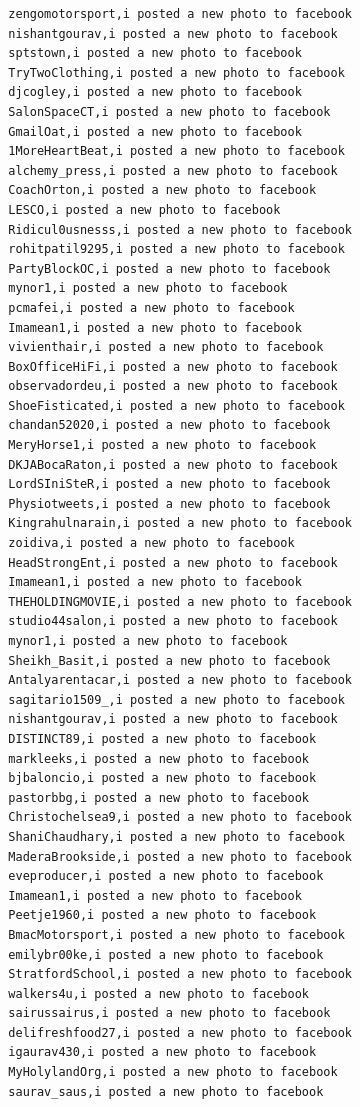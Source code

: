 \begin{figure}[htpb]
\begin{verbatim}
  zengomotorsport,i posted a new photo to facebook
  nishantgourav,i posted a new photo to facebook
  sptstown,i posted a new photo to facebook
  TryTwoClothing,i posted a new photo to facebook
  djcogley,i posted a new photo to facebook
  SalonSpaceCT,i posted a new photo to facebook
  GmailOat,i posted a new photo to facebook
  1MoreHeartBeat,i posted a new photo to facebook
  alchemy_press,i posted a new photo to facebook
  CoachOrton,i posted a new photo to facebook
  LESCO,i posted a new photo to facebook
  Ridicul0usnesss,i posted a new photo to facebook
  rohitpatil9295,i posted a new photo to facebook
  PartyBlockOC,i posted a new photo to facebook
  mynor1,i posted a new photo to facebook
  pcmafei,i posted a new photo to facebook
  Imamean1,i posted a new photo to facebook
  vivienthair,i posted a new photo to facebook
  BoxOfficeHiFi,i posted a new photo to facebook
  observadordeu,i posted a new photo to facebook
  ShoeFisticated,i posted a new photo to facebook
  chandan52020,i posted a new photo to facebook
  MeryHorse1,i posted a new photo to facebook
  DKJABocaRaton,i posted a new photo to facebook
  LordSIniSteR,i posted a new photo to facebook
  Physiotweets,i posted a new photo to facebook
  Kingrahulnarain,i posted a new photo to facebook
  zoidiva,i posted a new photo to facebook
  HeadStrongEnt,i posted a new photo to facebook
  Imamean1,i posted a new photo to facebook
  THEHOLDINGMOVIE,i posted a new photo to facebook
  studio44salon,i posted a new photo to facebook
  mynor1,i posted a new photo to facebook
  Sheikh_Basit,i posted a new photo to facebook
  Antalyarentacar,i posted a new photo to facebook
  sagitario1509_,i posted a new photo to facebook
  nishantgourav,i posted a new photo to facebook
  DISTINCT89,i posted a new photo to facebook
  markleeks,i posted a new photo to facebook
  bjbaloncio,i posted a new photo to facebook
  pastorbbg,i posted a new photo to facebook
  Christochelsea9,i posted a new photo to facebook
  ShaniChaudhary,i posted a new photo to facebook
  MaderaBrookside,i posted a new photo to facebook
  eveproducer,i posted a new photo to facebook
  Imamean1,i posted a new photo to facebook
  Peetje1960,i posted a new photo to facebook
  BmacMotorsport,i posted a new photo to facebook
  emilybr00ke,i posted a new photo to facebook
  StratfordSchool,i posted a new photo to facebook
  walkers4u,i posted a new photo to facebook
  sairussairus,i posted a new photo to facebook
  delifreshfood27,i posted a new photo to facebook
  igaurav430,i posted a new photo to facebook
  MyHolylandOrg,i posted a new photo to facebook
  saurav_saus,i posted a new photo to facebook


\end{verbatim}
\end{figure}
